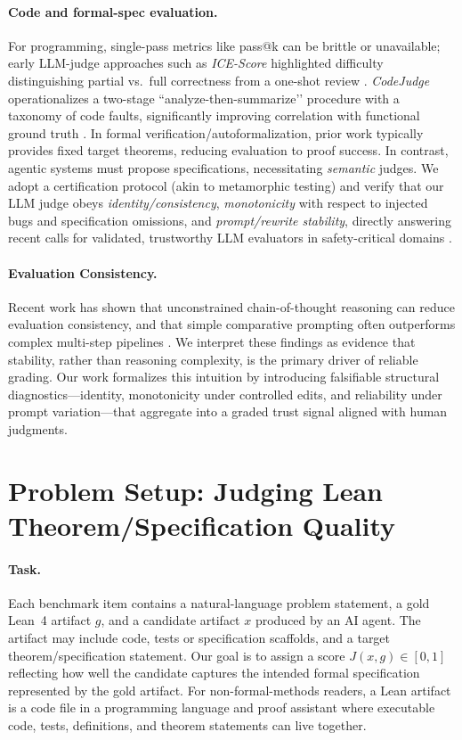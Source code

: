 \documentclass{article}
\begin{document}
\paragraph{Code and formal-spec evaluation.}
For programming, single-pass metrics like pass@k can be brittle or unavailable; early LLM-judge approaches such as \emph{ICE-Score} highlighted difficulty distinguishing partial vs.\ full correctness from a one-shot review \citep{Zhuo2024ICEScore}. \emph{CodeJudge} operationalizes a two-stage “analyze-then-summarize’’ procedure with a taxonomy of code faults, significantly improving correlation with functional ground truth \citep{TongZhang2024CodeJudge}. In formal verification/autoformalization, prior work typically provides fixed target theorems, reducing evaluation to proof success. In contrast, agentic systems must propose specifications, necessitating \emph{semantic} judges. We adopt a certification protocol (akin to metamorphic testing) and verify that our LLM judge obeys \emph{identity/consistency}, \emph{monotonicity} with respect to injected bugs and specification omissions, and \emph{prompt/rewrite stability}, directly answering recent calls for validated, trustworthy LLM evaluators in safety-critical domains \citep{Kocmi2024HumanVsLLM,Li2024TrustLLMJudgments}.

\paragraph{Evaluation Consistency.}
Recent work has shown that unconstrained chain-of-thought reasoning can reduce evaluation consistency, and that simple comparative prompting often outperforms complex multi-step pipelines \citep{chen2026rethinking}. We interpret these findings as evidence that stability, rather than reasoning complexity, is the primary driver of reliable grading. Our work formalizes this intuition by introducing falsifiable structural diagnostics---identity, monotonicity under controlled edits, and reliability under prompt variation---that aggregate into a graded trust signal aligned with human judgments.

\section{Problem Setup: Judging Lean Theorem/Specification Quality}\label{sec:problem-setup}
\paragraph{Task.}
Each benchmark item contains a natural-language problem statement, a gold Lean~4 artifact
$g$, and a candidate artifact $x$ produced by an AI agent. The artifact may include code,
tests or specification scaffolds, and a target theorem/specification statement. Our goal is
to assign a score $J(x,g) \in [0,1]$ reflecting how well the candidate captures the intended formal specification represented
by the gold artifact.
For non-formal-methods readers, a Lean artifact is a code file in a programming language and proof assistant where executable code, tests, definitions, and theorem statements can live together.
\end{document}
